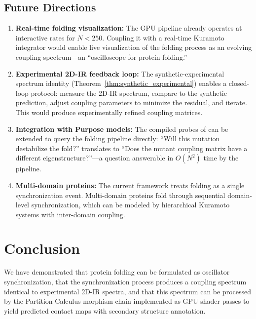 \documentclass[11pt,twocolumn,a4paper]{article}
\theoremstyle{definition}
\theoremstyle{remark}
\begin{document}
\subsection{Future Directions}

\begin{enumerate}
    \item \textbf{Real-time folding visualization:} The GPU pipeline already operates at interactive rates for $N < 250$. Coupling it with a real-time Kuramoto integrator would enable live visualization of the folding process as an evolving coupling spectrum---an ``oscilloscope for protein folding.''

    \item \textbf{Experimental 2D-IR feedback loop:} The synthetic-experimental spectrum identity (Theorem~\ref{thm:synthetic_experimental}) enables a closed-loop protocol: measure the 2D-IR spectrum, compare to the synthetic prediction, adjust coupling parameters to minimize the residual, and iterate. This would produce experimentally refined coupling matrices.

    \item \textbf{Integration with Purpose models:} The compiled probes of \citet{sachikonye2025f} can be extended to query the folding pipeline directly: ``Will this mutation destabilize the fold?'' translates to ``Does the mutant coupling matrix have a different eigenstructure?''---a question answerable in $O(N^2)$ time by the pipeline.

    \item \textbf{Multi-domain proteins:} The current framework treats folding as a single synchronization event. Multi-domain proteins fold through sequential domain-level synchronization, which can be modeled by hierarchical Kuramoto systems with inter-domain coupling.
\end{enumerate}

\section{Conclusion}
\label{sec:conclusion}

We have demonstrated that protein folding can be formulated as oscillator synchronization, that the synchronization process produces a coupling spectrum identical to experimental 2D-IR spectra, and that this spectrum can be processed by the Partition Calculus morphism chain implemented as GPU shader passes to yield predicted contact maps with secondary structure annotation.
\end{document}
